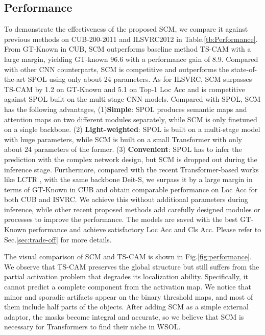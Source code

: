 \documentclass[runningheads]{llncs}
\begin{document}
\subsection{Performance}
To demonstrate the effectiveness of the proposed SCM, we compare it against previous methods on CUB-200-2011 and ILSVRC2012 in Table.\ref{tb:Performance}. From GT-Known in CUB, SCM outperforms baseline method TS-CAM \cite{gao2021tscam} with a large margin, yielding GT-known 96.6 with a performance gain of 8.9. Compared with other CNN counterparts, SCM is competitive and outperforms the state-of-the-art SPOL \cite{Wei_2021_CVPR} using only about 24 parameters. As for ILSVRC, SCM surpasses TS-CAM by 1.2 on GT-Known and 5.1 on Top-1 Loc Acc and is competitive against SPOL built on the multi-stage CNN models. Compared with SPOL, SCM has the following advantages, 
(1)\textbf{Simple}: SPOL produces semantic maps and attention maps on two different modules separately, while SCM is only finetuned on a single backbone. 
(2) \textbf{Light-weighted}: SPOL is built on a multi-stage model with huge parameters, while SCM is built on a small Transformer with only about 24 parameters of the former. 
(3) \textbf{Convenient}: SPOL has to infer the prediction with the complex network design, but SCM is dropped out during the inference stage. Furthermore, compared with the recent Transformer-based works like LCTR \cite{chen2022lctr}, with the same backbone Deit-S, we surpass it by a large margin  in terms of GT-Known in CUB and obtain comparable performance on Loc Acc for both CUB and ISVRC. 
We achieve this without additional parameters during inference, while other recent proposed methods add carefully designed modules or processes to improve the performance. 
The models are saved with the best GT-Known performance and achieve satisfactory Loc Acc and Cls Acc. Please refer to Sec.\ref{sec:trade-off} for more details.

The visual comparison of SCM and TS-CAM is shown in Fig.\ref{fig:performance}. We observe that TS-CAM preserves the global structure but still suffers from the partial activation problem that degrades its localization ability. 
Specifically, it cannot predict a complete component from the activation map. We notice that minor and sporadic artifacts appear on the binary threshold maps, and most of them include half parts of the objects. After adding SCM as a simple external adaptor, the masks become integral and accurate, so we believe that SCM is necessary for Transformers to find their niche in WSOL.
\end{document}
